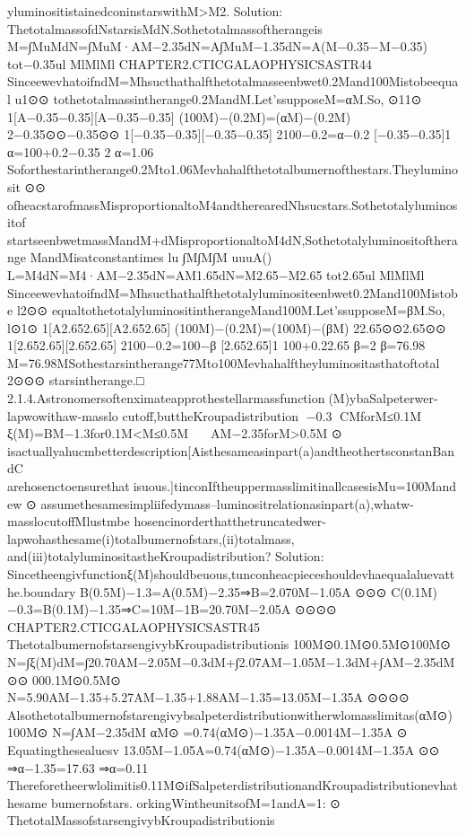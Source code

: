 yluminositistainedconinstarswithM>M2.
Solution:
ThetotalmassofdNstarsisMdN.Sothetotalmassoftherangeis
M=∫MuMdN=∫MuM·AM−2.35dN=A∫MuM−1.35dN=A(M−0.35−M−0.35)
tot−0.35ul
MlMlMl
CHAPTER2.CTICGALAOPHYSICSASTR44
SinceewevhatoifndM=Mhsucthathalfthetotalmasseenbwet0.2Mand100Mistobeequal
u1⊙⊙
tothetotalmassintherange0.2MandM.Let’ssupposeM=αM.So,
⊙11⊙
1[A{−0.35−0.35}][A{−0.35−0.35}]
(100M)−(0.2M)=(αM)−(0.2M)
2−0.35⊙⊙−0.35⊙⊙
1[−0.35−0.35][−0.35−0.35]
2100−0.2=α−0.2
[−0.35−0.35]1
α=100+0.2−0.35
2
α=1.06
Soforthestarintherange0.2Mto1.06Mevhahalfthetotalbumernofthestars.Theyluminosit
⊙⊙
ofheacstarofmassMisproportionaltoM4andtherearedNhsucstars.Sothetotalyluminositof
startseenbwetmassMandM+dMisproportionaltoM4dN,Sothetotalyluminositoftherange
MandMisatconstantimes
lu
∫M∫M∫M
uuuA()
L=M4dN=M4·AM−2.35dN=AM1.65dN=M2.65−M2.65
tot2.65ul
MlMlMl
SinceewevhatoifndM=Mhsucthathalfthetotalyluminositeenbwet0.2Mand100Mistobe
l2⊙⊙
equaltothetotalyluminositintherangeMand100M.Let’ssupposeM=βM.So,
l⊙1⊙
1[A{2.652.65}][A{2.652.65}]
(100M)−(0.2M)=(100M)−(βM)
22.65⊙⊙2.65⊙⊙
1[2.652.65][2.652.65]
2100−0.2=100−β
[2.652.65]1
100+0.22.65
β=2
β=76.98
M=76.98MSothestarsintherange77Mto100Mevhahalftheyluminositasthatoftotal
2⊙⊙⊙
starsintherange.□
2.1.4.Astronomersoftenximateapprothestellarmassfunction￿(M)ybaSalpeterwer-lapwowithaw-masslo
cutoff,buttheKroupadistribution
−0.3
CMforM≤0.1M
⊙
ξ(M)=BM−1.3for0.1M<M≤0.5M
⊙⊙
AM−2.35forM>0.5M
⊙
isactuallyahucmbetterdescription[Aisthesameasinpart(a)andtheothertsconstanBandC
arehosenctoensurethat￿isuous.]tinconIftheuppermasslimitinallcasesisMu=100Mandew
⊙
assumethesamesimpliifedymass–luminositrelationasinpart(a),whatw-masslocutoffMlustmbe
hosencinorderthatthetruncatedwer-lapwohasthesame(i)totalbumernofstars,(ii)totalmass,
and(iii)totalyluminositastheKroupadistribution?
Solution:
Sincetheengivfunctionξ(M)shouldbeuous,tunconheacpieceshouldevhaequalaluevatthe.boundary
B(0.5M)−1.3=A(0.5M)−2.35⇒B=2.070M−1.05A
⊙⊙⊙
C(0.1M)−0.3=B(0.1M)−1.35⇒C=10M−1B=20.70M−2.05A
⊙⊙⊙⊙
CHAPTER2.CTICGALAOPHYSICSASTR45
ThetotalbumernofstarsengivybKroupadistributionis
100M⊙0.1M⊙0.5M⊙100M⊙
N=∫ξ(M)dM=∫20.70AM−2.05M−0.3dM+∫2.07AM−1.05M−1.3dM+∫AM−2.35dM
⊙⊙
000.1M⊙0.5M⊙
N=5.90AM−1.35+5.27AM−1.35+1.88AM−1.35=13.05M−1.35A
⊙⊙⊙⊙
Alsothetotalbumernofstarengivybsalpeterdistributionwitherwlomasslimitas(αM⊙)
100M⊙
N=∫AM−2.35dM
αM⊙
=0.74(αM⊙)−1.35A−0.0014M−1.35A
⊙
Equatingthesealuesv
13.05M−1.05A=0.74(αM⊙)−1.35A−0.0014M−1.35A
⊙⊙
⇒α−1.35=17.63
⇒α=0.11
Thereforetheerwlolimitis0.11M⊙ifSalpeterdistributionandKroupadistributionevhathesame
bumernofstars.
orkingWintheunitsofM=1andA=1:
⊙
ThetotalMassofstarsengivybKroupadistributionis
